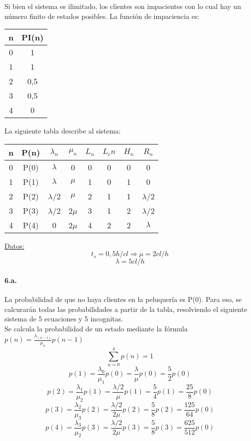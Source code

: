 \documentclass{article}
\begin{document}
    Si bien el sistema es ilimitado, los clientes son impacientes con lo cual hay un número finito de estados posibles. La función de impaciencia es:
    \begin{center}
    \begin{tabular}{|| c | c ||}
    \hline 
    n & PI(n) \\ \hline \hline
    0 & 1\\ \hline
    1 & 1\\ \hline
    2 & 0,5\\ \hline
    3 & 0,5\\ \hline
    4 & 0\\ \hline
    
    \end{tabular}
    \end{center}
    La siguiente tabla describe al sistema:
    \begin{center}
    \begin{tabular}{|| c | c | c | c | c | c | c | c ||}
    \hline 
     n & P(n) & $\lambda_n$ & $\mu_n$ & $L_n$& $L_cn$ & $H_n$ & $R_n$ \\ \hline \hline
     0 & P(0) & $\lambda$   & 0       & 0    & 0      & 0     & 0	\\ \hline
     1 & P(1) & $\lambda$   & $\mu$   & 1    & 0      & 1     & 0	\\ \hline
     2 & P(2) & $\lambda$/2 & $\mu$   & 2    & 1      & 1     & $\lambda$/2	\\ \hline
     3 & P(3) & $\lambda$/2 & 2$\mu$  & 3    & 1      & 2     & $\lambda$/2 \\ \hline
     4 & P(4) & 0           & 2$\mu$  & 4    & 2      & 2     & $\lambda$   \\ \hline  
     
    \end{tabular}
    \end{center}
    \underline{Datos:} \\
    $$t_s = 0,5 h/cl  \Rightarrow \mu = 2 cl/h $$
    $$\lambda = 5 cl/h $$
    
    \paragraph{6.a.} La probabilidad de que no haya clientes en la peluquería es P(0). Para eso, se calcurarán todas las probabilidades a partir de la tabla,
    resolviendo el siguiente sistema de 5 ecuaciones y 5 incognitas.\\
    Se calcula la probabilidad de un estado mediante la fórmula $p(n) = \frac{\lambda_(n-1)}{\mu_n} p(n-1)$
    $$ \sum_{n=0}^{4} p(n) = 1 $$
    $$ p(1) = \frac{\lambda_0}{\mu_1}p(0) = \frac{\lambda}{\mu}p(0) = \frac{5}{2}p(0)$$
    $$ p(2) = \frac{\lambda_1}{\mu_2}p(1) = \frac{\lambda/2}{\mu}p(1) = \frac{5}{4}p(1) = \frac{25}{8}p(0)$$
    $$ p(3) = \frac{\lambda_2}{\mu_3}p(2) = \frac{\lambda/2}{2\mu}p(2) = \frac{5}{8}p(2) = \frac{125}{64}p(0)$$
    $$ p(4) = \frac{\lambda_3}{\mu_2}p(3) = \frac{\lambda/2}{2\mu}p(3) = \frac{5}{8}p(3) = \frac{625}{512}p(0)$$
    
\end{document}
